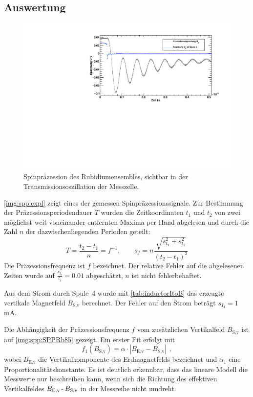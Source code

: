 \subsection{Auswertung}
\begin{figure}[H]
\begin{center}
  \includegraphics[width=\textwidth]{../img/part4/02-63-7mA-087mA.pdf}
  \caption{Spinpräzession des Rubidiumensembles, sichtbar in der Transmissionsoszillation der Messzelle.} %
  \label{img:spp:expl}
\end{center}
\end{figure} 

\autoref{img:spp:expl} zeigt eines der gemessen Spinpräzessionssignale.
Zur Bestimmung der Präzessionsperiodendauer $T$ wurden die Zeitkoordinaten $t_1$ und $t_2$
von zwei möglichst weit voneinander entfernten Maxima per Hand abgelesen und durch
die Zahl $n$ der dazwischenliegenden Perioden geteilt:
\begin{equation}
  T=\frac{t_2-t_1}{n}=f^{-1}, \qquad s_f = n \frac{\sqrt{s_{t_2}^2 + s_{t_1}^2}}{ \left( t_2 -t_1 \right)^2 }
\end{equation}
Die Präzessionsfrequenz ist $f$ bezeichnet.
Der relative Fehler auf die abgelesenen Zeiten wurde auf $\frac{s_{t_i}}{t_i}=0.01$ abgeschätzt,
$n$ ist nicht fehlerbehaftet.

Aus dem Strom durch Spule~4 wurde mit \autoref{tab:inductorItoB} das erzeugte vertikale Magnetfeld
$B_\text{S,v}$ berechnet. Der Fehler auf den Strom beträgt $s_{I_4}=1$\,mA.

Die Abhängigkeit der Präzessionsfrequenz $f$ vom zusätzlichen Vertikalfeld $B_\text{S,v}$ ist auf
\autoref{img:spp:SPPRb85} gezeigt.
Ein erster Fit erfolgt mit
\begin{equation}
  f_1(B_\text{S,v})=\alpha \cdot |B_\text{E,v}-B_\text{S,v}| \ \, ,
\end{equation}
wobei $B_\text{E,v}$ die Vertikalkomponente des Erdmagnetfelds bezeichnet und
$\alpha_1$ eine Proportionalitätskonstante.
Es ist deutlich erkennbar, dass das lineare Modell die Messwerte nur beschreiben kann,
wenn sich die Richtung des effektiven Vertikalfeldes
$B_\text{E,v} \text{\,-\,} B_\text{S,v}$ in der Messreihe nicht umdreht.

